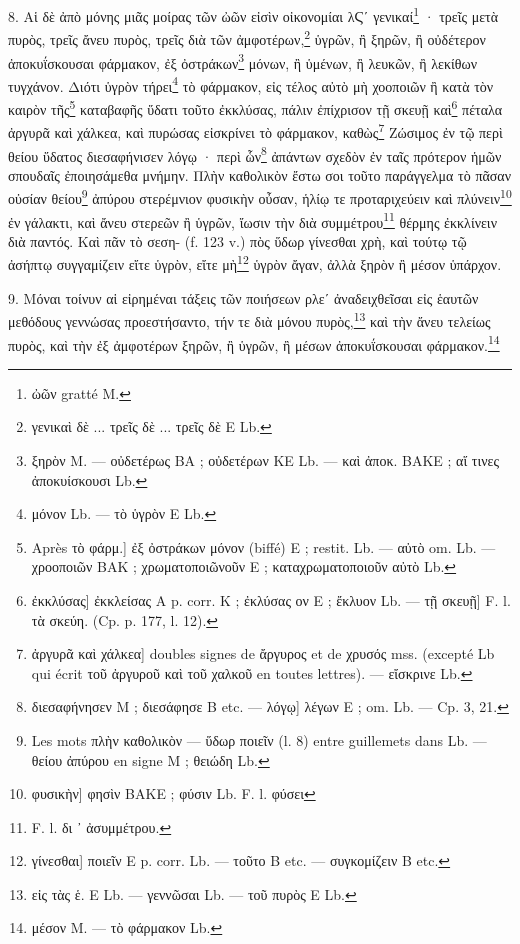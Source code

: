\documentclass[a4paper, 11pt, oneside, polutonikogreek, french]{article}
\begin{document}
8. Αἱ δὲ ἀπὸ μόνης μιᾶς μοίρας τῶν ὠῶν εἰσὶν οἰκονομίαι λϚʹ γενικαί\footnote{ὠῶν gratté M.} · τρεῖς μετὰ πυρὸς, τρεῖς ἄνευ πυρὸς, τρεῖς διὰ τῶν ἀμφοτέρων,\footnote{γενικαὶ δὲ ... τρεῖς δὲ ... τρεῖς δὲ E Lb.} ὑγρῶν, ἢ ξηρῶν, ἢ οὐδέτερον ἀποκυΐσκουσαι φάρμακον, ἐξ ὀστράκων\footnote{ξηρὸν M. --- οὐδετέρως BA ; οὐδετέρων KE Lb. --- καὶ ἀποκ. BAKE ; αἵ τινες ἀποκυίσκουσι Lb.} μόνων, ἢ ὑμένων, ἢ λευκῶν, ἢ λεκίθων τυγχάνον. Διότι ὑγρὸν τήρει\footnote{μόνον Lb. --- τὸ ὑγρὸν E Lb.} τὸ φάρμακον, εἰς τέλος αὐτὸ μὴ χοοποιῶν ἢ κατὰ τὸν καιρὸν τῆς\footnote{Après τὸ φάρμ.] ἐξ ὀστράκων μόνον (biffé) E ; restit. Lb. --- αὐτὸ om. Lb. --- χροοποιῶν BAK ; χρωματοποιῶνοῦν E ; καταχρωματοποιοῦν αὐτὸ Lb.} καταβαφῆς ὕδατι τοῦτο ἐκκλύσας, πάλιν ἐπίχρισον τῇ σκευῇ καὶ\footnote{ἐκκλύσας] ἐκκλείσας A p. corr. K ; ἐκλύσας ον E ; ἔκλυον Lb. --- τῇ σκευῇ] F. l. τὰ σκεύη. (Cp. p. 177, l. 12).} πέταλα ἀργυρᾶ καὶ χάλκεα, καὶ πυρώσας εἰσκρίνει τὸ φάρμακον, καθὼς\footnote{ἀργυρᾶ καὶ χάλκεα] doubles signes de ἄργυρος et de χρυσός mss. (excepté Lb qui écrit τοῦ ἀργυροῦ καὶ τοῦ χαλκοῦ en toutes lettres). --- εἴσκρινε Lb.} Ζώσιμος ἐν τῷ περὶ θείου ὕδατος διεσαφήνισεν λόγῳ · περὶ ὧν\footnote{διεσαφήνησεν M ; διεσάφησε B etc. --- λόγῳ] λέγων E ; om. Lb. --- Cp. 3, 21.} ἀπάντων σχεδὸν ἐν ταῖς πρότερον ἡμῶν σπουδαῖς ἐποιησάμεθα μνήμην. Πλὴν καθολικὸν ἔστω σοι τοῦτο παράγγελμα τὸ πᾶσαν οὐσίαν θείου\footnote{Les mots πλὴν καθολικὸν --- ὕδωρ ποιεῖν (l. 8) entre guillemets dans Lb. --- θείου ἀπύρου en signe M ; θειώδη Lb.} ἀπύρου στερέμνιον φυσικὴν οὖσαν, ἡλίῳ τε προταριχεύειν καὶ πλύνειν\footnote{φυσικὴν] φησὶν BAKE ; φύσιν Lb. F. l. φύσει} ἐν γάλακτι, καὶ ἄνευ στερεῶν ἢ ὑγρῶν, ἴωσιν τὴν διὰ συμμέτρου\footnote{F. l. δι ᾽ ἀσυμμέτρου.} θέρμης ἐκκλίνειν διὰ παντός. Καὶ πᾶν τὸ σεση- (f. 123 v.) πὸς ὕδωρ γίνεσθαι χρὴ, καὶ τούτῳ τῷ ἀσήπτῳ συγγαμίζειν εἴτε ὑγρὸν, εἴτε μὴ\footnote{γίνεσθαι] ποιεῖν E p. corr. Lb. --- τοῦτο B etc. --- συγκομίζειν B etc.} ὑγρὸν ἄγαν, ἀλλὰ ξηρὸν ἢ μέσον ὑπάρχον.

9. Μόναι τοίνυν αἱ εἰρημέναι τάξεις τῶν ποιήσεων ρλεʹ ἀναδειχθεῖσαι εἰς ἑαυτῶν μεθόδους γεννώσας προεστήσαντο, τήν τε διὰ μόνου πυρὸς,\footnote{εἰς τὰς ἑ. E Lb. --- γεννῶσαι Lb. --- τοῦ πυρὸς E Lb.} καὶ τὴν ἄνευ τελείως πυρὸς, καὶ τὴν ἐξ ἀμφοτέρων ξηρῶν, ἢ ὑγρῶν, ἢ μέσων ἀποκυΐσκουσαι φάρμακον.\footnote{μέσον M. --- τὸ φάρμακον Lb.}
\end{document}
